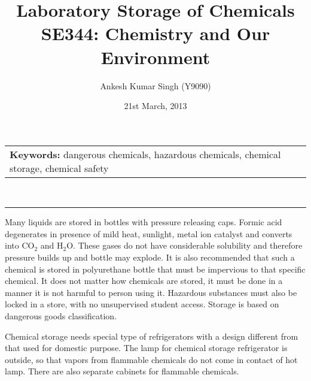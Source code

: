 \documentclass[pdftex,12pt,a4paper]{article}
\title{\vspace{-15pt}Laboratory Storage of Chemicals\\ SE344: Chemistry and Our Environment}
\author{Ankesh Kumar Singh (Y9090)}
\date{21st March, 2013}
\begin{document}
\maketitle
\begin{tabular}{p{370pt}}
\textbf{Keywords: }dangerous chemicals, hazardous chemicals, chemical storage, chemical safety
\end{tabular}
\vspace{10pt}\\
\hrule
\vspace{10pt}
Many liquids are stored in bottles with pressure releasing caps. Formic acid degenerates in presence of mild heat, sunlight, metal ion catalyst and converts into CO$_2$ and H$_2$O. These gases do not have considerable solubility and therefore pressure builds up and bottle may explode. It is also recommended that such a chemical is stored in polyurethane bottle that must be impervious to that specific chemical. It does not matter how chemicals are stored, it must be done in a manner it is not harmful to person using it. Hazardous substances must also be locked in a store, with no unsupervised student access. Storage is based on dangerous goods classification.

Chemical storage needs special type of refrigerators with a design different from that used for domestic purpose. The lamp for chemical storage refrigerator is outside, so that vapors from flammable chemicals do not come in contact of hot lamp. There are also separate cabinets for flammable chemicals.
\end{document}
